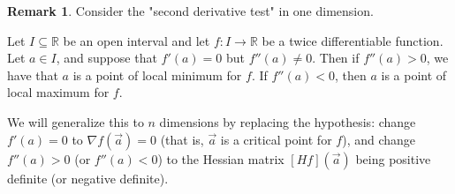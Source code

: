 \documentclass[11pt]{article}
\theoremstyle{definition}
\newtheorem{remark}[thm]{Remark}
\newcommand{\R}{\ensuremath{\mathbb{R}}}
\begin{document}
\begin{remark}
Consider the "second derivative test" in one dimension.

Let $I \subseteq \R$ be an open interval and let $f : I \to \R$ be a twice differentiable function. Let $a \in I$, and suppose that $f'(a) = 0$ but $f''(a) \neq 0$. Then if $f''(a) > 0$, we have that $a$ is a point of local minimum for $f$. If $f''(a) < 0$, then $a$ is a point of local maximum for $f$.

We will generalize this to $n$ dimensions by replacing the hypothesis: change $f'(a) = 0$ to $\nabla f(\vec{a}) = 0$ (that is, $\vec{a}$ is a critical point for $f$), and change $f''(a) > 0$ (or $f''(a) < 0$) to the Hessian matrix $[Hf](\vec{a})$ being positive definite (or negative definite).
\end{remark}
\end{document}
